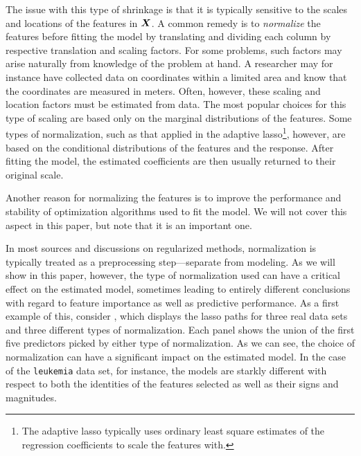 
The issue with this type of shrinkage is that it is typically sensitive to the scales and locations of the features in \(\mat X\).
A common remedy is to \emph{normalize} the features before fitting the model by translating and dividing each column by respective translation and scaling factors.
For some problems, such factors may arise naturally from knowledge of the problem at hand.
A researcher may for instance have collected data on coordinates within a limited area and know that the coordinates are measured in meters.
Often, however, these scaling and location factors must be estimated from data.
The most popular choices for this type of scaling are based only on the marginal distributions of the features.
Some types of normalization, such as that applied in the adaptive lasso\footnote{The adaptive lasso typically uses ordinary least square estimates of the regression coefficients to scale the features with.}, however, are based on the conditional distributions of the features and the response.
After fitting the model, the estimated coefficients are then usually returned to their original scale.

Another reason for normalizing the features is to improve the performance and stability of optimization algorithms used to fit the model.
We will not cover this aspect in this paper, but note that it is an important one.

In most sources and discussions on regularized methods, normalization is typically treated as a preprocessing step---separate from modeling. As we will show in this paper, however, the type of normalization used can have a critical effect on the estimated model, sometimes leading to entirely different conclusions with regard to feature importance as well as predictive performance. As a first example of this, consider , which displays the lasso paths for three real data sets and three different types of normalization. Each panel shows the union of the first five predictors picked by either type of normalization. As we can see, the choice of normalization can have a significant impact on the estimated model. In the case of the \texttt{leukemia} data set, for instance, the models are starkly different with respect to both the identities of the features selected as well as their signs and magnitudes.

